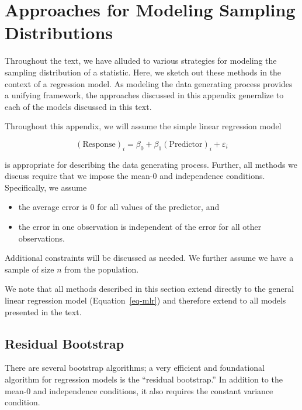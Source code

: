 \documentclass[
  letterpaper,
  DIV=11,
  numbers=noendperiod]{scrreprt}
\providecommand{\tightlist}{%
  \setlength{\itemsep}{0pt}\setlength{\parskip}{0pt}}\usepackage{longtable,booktabs,array}
\theoremstyle{definition}
\theoremstyle{definition}
\theoremstyle{plain}
\theoremstyle{remark}
\begin{document}
\cleardoublepage
{}
{}
\appendix

\hypertarget{sec-app-theory}{%
\chapter{Approaches for Modeling Sampling
Distributions}\label{sec-app-theory}}

Throughout the text, we have alluded to various strategies for modeling
the sampling distribution of a statistic. Here, we sketch out these
methods in the context of a regression model. As modeling the data
generating process provides a unifying framework, the approaches
discussed in this appendix generalize to each of the models discussed in
this text.

Throughout this appendix, we will assume the simple linear regression
model

\[(\text{Response})_i = \beta_0 + \beta_1 (\text{Predictor})_i + \varepsilon_i\]

is appropriate for describing the data generating process. Further, all
methods we discuss require that we impose the mean-0 and independence
conditions. Specifically, we assume

\begin{itemize}
\tightlist
\item
  the average error is 0 for all values of the predictor, and
\item
  the error in one observation is independent of the error for all other
  observations.
\end{itemize}

Additional constraints will be discussed as needed. We further assume we
have a sample of size \(n\) from the population.

We note that all methods described in this section extend directly to
the general linear regression model (Equation~\ref{eq-mlr}) and
therefore extend to all models presented in the text.

\hypertarget{residual-bootstrap}{%
\section{Residual Bootstrap}\label{residual-bootstrap}}

There are several bootstrap algorithms; a very efficient and
foundational algorithm for regression models is the ``residual
bootstrap.'' In addition to the mean-0 and independence conditions, it
also requires the constant variance condition.
\end{document}
